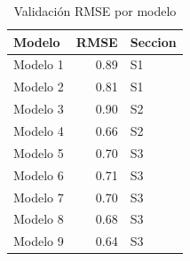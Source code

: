\begin{table}[ht]
\centering
\begin{tabular}{lrl}
  \toprule
Modelo & RMSE & Seccion \\ 
  \midrule
Modelo 1 & 0.89 & S1 \\ 
  Modelo 2 & 0.81 & S1 \\ 
  Modelo 3 & 0.90 & S2 \\ 
  Modelo 4 & 0.66 & S2 \\ 
  Modelo 5 & 0.70 & S3 \\ 
  Modelo 6 & 0.71 & S3 \\ 
  Modelo 7 & 0.70 & S3 \\ 
  Modelo 8 & 0.68 & S3 \\ 
  Modelo 9 & 0.64 & S3 \\ 
   \bottomrule
\end{tabular}
\caption{Validación RMSE por modelo} 
\label{tab:rmse}
\end{table}
